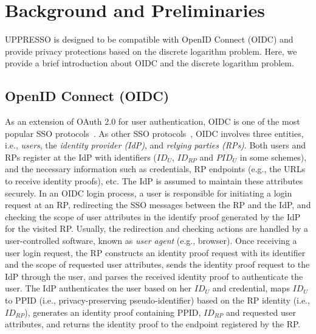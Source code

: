 \section{Background and Preliminaries}
\label{sec:background}
UPPRESSO is designed to be compatible with OpenID Connect (OIDC) and provide privacy protections based on the discrete logarithm problem.
Here, we provide a brief introduction about OIDC and the discrete logarithm problem.

\subsection{OpenID Connect (OIDC)}
\label{subsec:OIDC}
As an extension of OAuth 2.0 for user authentication, OIDC is one of the most popular SSO protocols~\cite{OpenIDConnect}.
As other SSO protocols~\cite{SAMLIdentifier}, OIDC involves three entities, i.e., {\em users}, the {\em identity provider (IdP)}, and {\em relying parties (RPs)}.
Both users and RPs register at the IdP with identifiers ($ID_U$, $ID_{RP}$ and $PID_U$ in some schemes),
   and the necessary information such as credentials, RP endpoints (e.g., the URLs to receive identity proofs), etc.
The IdP is assumed to maintain these attributes securely.
In an OIDC login process, a user is responsible for initiating a login request at an RP, redirecting the SSO messages between the RP and the IdP,
 and checking the scope of user attributes in the identify proof generated by the IdP for the visited RP.
Usually, the redirection and checking actions are handled by a user-controlled software,
 known as {\em user agent} (e.g., browser).
Once receiving a user login request, the RP constructs an identity proof request with its identifier and the scope of requested user attributes,
 sends the identity proof request to the IdP through the user, and parses the received identity proof to authenticate the user.
The IdP authenticates the user based on her $ID_U$ and credential,
 maps $ID_U$ to PPID (i.e., privacy-preserving pseudo-identifier) based on the RP identity (i.e., $ID_{RP}$),
 generates an identity proof containing PPID, $ID_{RP}$ and requested user attributes,
  and returns the identity proof to the endpoint registered by the RP.

